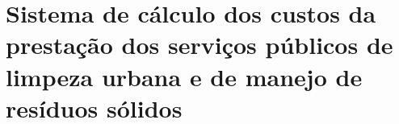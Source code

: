 \newpage
\section{Sistema de cálculo dos custos da prestação dos serviços públicos de limpeza urbana e de manejo de resíduos sólidos}
\label{sec:calculo_custo}

